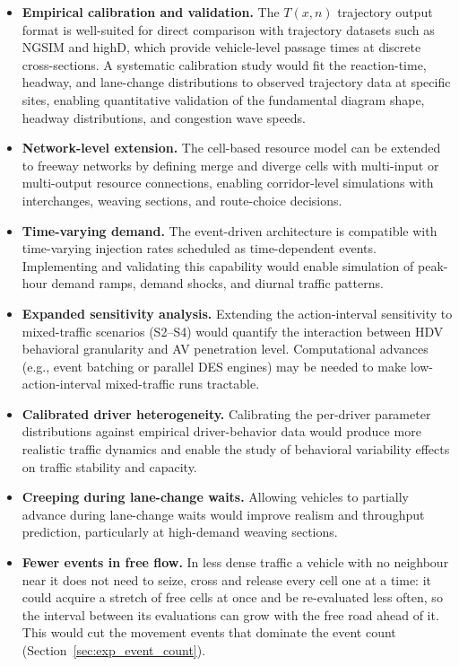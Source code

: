 \documentclass[review,number]{elsarticle}
\begin{document}
\begin{itemize}
    \item \textbf{Empirical calibration and validation.} The $T(x,n)$ trajectory output format is well-suited for direct comparison with trajectory datasets such as NGSIM and highD, which provide vehicle-level passage times at discrete cross-sections. A systematic calibration study would fit the reaction-time, headway, and lane-change distributions to observed trajectory data at specific sites, enabling quantitative validation of the fundamental diagram shape, headway distributions, and congestion wave speeds.

    \item \textbf{Network-level extension.} The cell-based resource model can be extended to freeway networks by defining merge and diverge cells with multi-input or multi-output resource connections, enabling corridor-level simulations with interchanges, weaving sections, and route-choice decisions.

    \item \textbf{Time-varying demand.} The event-driven architecture is compatible with time-varying injection rates scheduled as time-dependent events. Implementing and validating this capability would enable simulation of peak-hour demand ramps, demand shocks, and diurnal traffic patterns.

    \item \textbf{Expanded sensitivity analysis.} Extending the action-interval sensitivity to mixed-traffic scenarios (S2--S4) would quantify the interaction between HDV behavioral granularity and AV penetration level. Computational advances (e.g., event batching or parallel DES engines) may be needed to make low-action-interval mixed-traffic runs tractable.

    \item \textbf{Calibrated driver heterogeneity.} Calibrating the per-driver parameter distributions against empirical driver-behavior data would produce more realistic traffic dynamics and enable the study of behavioral variability effects on traffic stability and capacity.

    \item \textbf{Creeping during lane-change waits.} Allowing vehicles to partially advance during lane-change waits would improve realism and throughput prediction, particularly at high-demand weaving sections.

    \item \textbf{Fewer events in free flow.} In less dense traffic a vehicle with no neighbour near it does not need to seize, cross and release every cell one at a time: it could acquire a stretch of free cells at once and be re-evaluated less often, so the interval between its evaluations can grow with the free road ahead of it. This would cut the movement events that dominate the event count (Section~\ref{sec:exp_event_count}).


\end{itemize}
\end{document}
